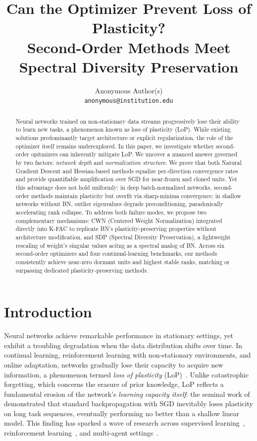 \documentclass{article}
\title{Can the Optimizer Prevent Loss of Plasticity? \\ Second-Order Methods Meet Spectral Diversity Preservation}
\author{%
  Anonymous Author(s) \\
  \texttt{anonymous@institution.edu}
}
\begin{document}
\maketitle

\begin{abstract}
Neural networks trained on non-stationary data streams progressively lose their ability to learn new tasks, a phenomenon known as loss of plasticity (LoP). While existing solutions predominantly target architecture or explicit regularization, the role of the optimizer itself remains underexplored. In this paper, we investigate whether second-order opitmizers can inherently mitigate LoP. We uncover a nuanced answer governed by two factors: \emph{network depth} and \emph{normalization structure}. We prove that both Natural Gradient Descent and Hessian-based methods equalize per-direction convergence rates and provide quantifiable amplification over SGD for near-frozen and cloned units. Yet this advantage does not hold uniformly: in deep batch-normalized networks, second-order methods maintain plasticity but overfit via sharp-minima convergence; in shallow networks without BN, outlier eigenvalues degrade preconditioning, paradoxically accelerating rank collapse. To address both failure modes, we propose two complementary mechanisms: CWN (Centered Weight Normalization) integrated directly into K-FAC to replicate BN's plasticity-preserving properties without architecture modification, and SDP (Spectral Diversity Preservation), a lightweight rescaling of weight's singular values acitng as a spectral analog of BN. Across six second-order optimizers and four continual-learning benchmarks, our methods consistently achieve near-zero dormant units and highest stable ranks, matching or surpassing dedicated plasticity-preserving methods.

\end{abstract}

\section{Introduction}
\label{sec:intro}

Neural networks achieve remarkable performance in stationary settings, yet exhibit a 
troubling degradation when the data distribution shifts over time. In continual 
learning, reinforcement learning with non-stationary 
environments, and online adaptation, networks 
gradually lose their capacity to acquire new information, a phenomenon termed \emph{loss 
of plasticity} (LoP)~\citep{lyle2023understanding, dohare2024loss}. Unlike catastrophic 
forgetting, which concerns the erasure of prior knowledge, LoP 
reflects a fundamental erosion of the network's \emph{learning capacity itself}: the seminal 
work of~\citet{dohare2024loss} demonstrated that standard backpropagation with SGD 
inevitably loses plasticity on long task sequences, eventually performing no better than a 
shallow linear model. This finding has sparked a wave of research across supervised 
learning~\citep{lewandowski2025spectral, farias2025snr, shin2024dash}, reinforcement 
learning~\citep{nikishin2023plasticity, juliani2024plasticity, tang2025mitigating}, and 
multi-agent settings~\citep{qin2024reborn}.
\end{document}
